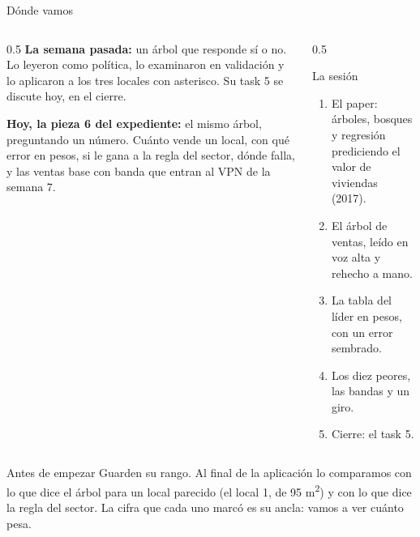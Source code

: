 \documentclass{beamer}
\begin{document}
\begin{frame}
\titlepage
\end{frame}

\begin{frame}{Dónde vamos}
\begin{columns}[T]
\begin{column}{0.5\textwidth}
\textbf{La semana pasada:} un árbol que responde sí o no. Lo leyeron como política, lo examinaron en validación y lo aplicaron a los tres locales con asterisco. Su task 5 se discute hoy, en el cierre.

\medskip
\textbf{Hoy, la pieza 6 del expediente:} el mismo árbol, preguntando un número. Cuánto vende un local, con qué error en pesos, si le gana a la regla del sector, dónde falla, y las ventas base con banda que entran al VPN de la semana 7.
\end{column}
\begin{column}{0.5\textwidth}
\begin{block}{La sesión}
\begin{enumerate}
  \item El paper: árboles, bosques y regresión prediciendo el valor de viviendas (2017).
  \item El árbol de ventas, leído en voz alta y rehecho a mano.
  \item La tabla del líder en pesos, con un error sembrado.
  \item Los diez peores, las bandas y un giro.
  \item Cierre: el task 5.
\end{enumerate}
\end{block}
\end{column}
\end{columns}
\end{frame}

\begin{frame}{Antes de empezar}
\medskip
\small Guarden su rango. Al final de la aplicación lo comparamos con lo que dice el árbol para un local parecido (el local 1, de 95 m\textsuperscript{2}) y con lo que dice la regla del sector. La cifra que cada uno marcó es su ancla: vamos a ver cuánto pesa.
\end{frame}
\end{document}
